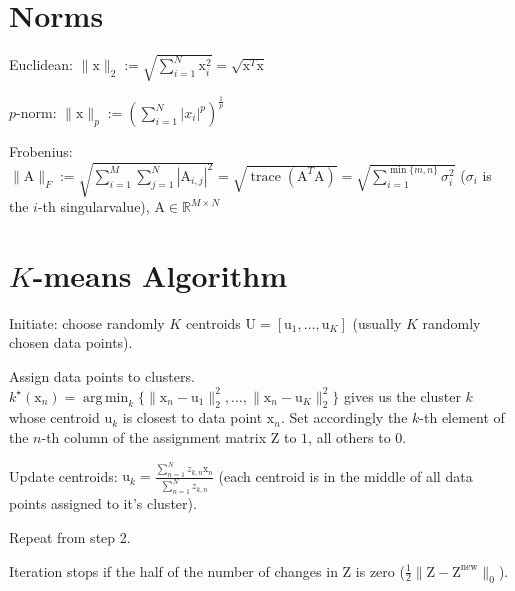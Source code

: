 \documentclass[a4paper, 11pt, landscape]{article}
\newcommand{\matr}[1]{\boldsymbol{\mathrm{#1}}}
\DeclareMathOperator*{\argmin}{arg\,min}
\begin{document}
\begin{multicols*}{3}
\section{Norms}
\begin{compactdesc}
	\item[Euclidean:] $\|\matr{x}\|_2 := \sqrt{\sum_{i=1}^{N} \matr{x}_i^2} = \sqrt{\matr{x}^T \matr{x}}$
	\item[$p$-norm:] $\|\matr{x}\|_p := \left( \sum_{i=1}^{N} |x_i|^p \right)^{\frac{1}{p}}$
	\item[Frobenius:] $\|\matr{A}\|_F :=\allowbreak \sqrt{\sum_{i=1}^{M} \sum_{j=1}^{N} |\matr{A}_{i, j}|^2} =\allowbreak \sqrt{\operatorname{trace}(\matr{A}^T \matr{A})} =\allowbreak \sqrt{\sum_{i=1}^{\min\{m, n\}} \sigma_i^2}$ ($\sigma_i$ is the $i$-th singularvalue), $\matr{A} \in \mathbb{R}^{M \times N}$
\end{compactdesc}

\section{$K$-means Algorithm}
\begin{compactenum}
	\item Initiate: choose randomly $K$ centroids $\matr{U} = [\matr{u}_1, \ldots, \matr{u}_K]$ (usually $K$ randomly chosen data points).
	\item Assign data points to clusters. $k^\star(\matr{x}_n) = \argmin_k \{ \|\matr{x}_n - \matr{u}_1\|_2^2, \ldots, \|\matr{x}_n - \matr{u}_K\|_2^2 \}$ gives us the cluster $k$ whose centroid $\matr{u}_k$ is closest to data point $\matr{x}_n$. Set accordingly the $k$-th element of the $n$-th column of the assignment matrix $\matr{Z}$ to $1$, all others to $0$.
	\item Update centroids: $\matr{u}_k = \frac{\sum_{n=1}^N z_{k,n} \matr{x}_n}{\sum_{n=1}^N z_{k,n}}$ (each centroid is in the middle of all data points assigned to it's cluster).
	\item Repeat from step 2.
\end{compactenum}
Iteration stops if the half of the number of changes in $\matr{Z}$ is zero ($\frac{1}{2} \|\matr{Z} - \matr{Z}^\text{new}\|_0$).


\end{multicols*}
\end{document}
